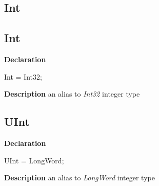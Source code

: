 \documentclass{report}
\newif\ifpdf
\begin{document}
\subsection*{\large{\textbf{Int}}\normalsize\hspace{1ex}\hrulefill}
\else
\subsection*{Int}
\fi
\label{NewPascal.Base-Int}
\begin{list}{}{
\setlength{\itemindent}{0cm}
\setlength{\listparindent}{0cm}
\setlength{\leftmargin}{\evensidemargin}
\addtolength{\leftmargin}{\tmplength}
\settowidth{\labelsep}{X}
\addtolength{\leftmargin}{\labelsep}
\setlength{\labelwidth}{\tmplength}
}
\item[\textbf{Declaration}\hfill]
\ifpdf
\begin{flushleft}
\fi
\begin{ttfamily}
Int = Int32;\end{ttfamily}

\ifpdf
\end{flushleft}
\fi

\par
\item[\textbf{Description}]
an alias to \textit{Int32} integer type

\end{list}
\ifpdf
\subsection*{\large{\textbf{UInt}}\normalsize\hspace{1ex}\hrulefill}
\else
\subsection*{UInt}
\fi
\label{NewPascal.Base-UInt}
\begin{list}{}{
\setlength{\itemindent}{0cm}
\setlength{\listparindent}{0cm}
\setlength{\leftmargin}{\evensidemargin}
\addtolength{\leftmargin}{\tmplength}
\settowidth{\labelsep}{X}
\addtolength{\leftmargin}{\labelsep}
\setlength{\labelwidth}{\tmplength}
}
\item[\textbf{Declaration}\hfill]
\ifpdf
\begin{flushleft}
\fi
\begin{ttfamily}
UInt = LongWord;\end{ttfamily}

\ifpdf
\end{flushleft}
\fi

\par
\item[\textbf{Description}]
an alias to \textit{LongWord} integer type

\end{list}
\ifpdf
\end{document}
